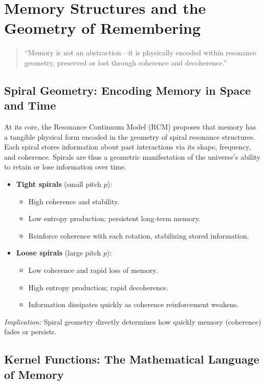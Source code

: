 \section{Memory Structures and the Geometry of Remembering}
\begin{quote}
“Memory is not an abstraction—it is physically encoded within resonance geometry, preserved or lost through coherence and decoherence.”
\end{quote}

\subsection{Spiral Geometry: Encoding Memory in Space and Time}

At its core, the Resonance Continuum Model (RCM) proposes that memory has a tangible physical form encoded in the geometry of spiral resonance structures.  Each spiral stores information about past interactions via its shape, frequency, and coherence.  Spirals are thus a geometric manifestation of the universe’s ability to retain or lose information over time.

\begin{itemize}
  \item \textbf{Tight spirals} (small pitch \(p\)):
    \begin{itemize}
      \item High coherence and stability.
      \item Low entropy production; persistent long‐term memory.
      \item Reinforce coherence with each rotation, stabilizing stored information.
    \end{itemize}
  \item \textbf{Loose spirals} (large pitch \(p\)):
    \begin{itemize}
      \item Low coherence and rapid loss of memory.
      \item High entropy production; rapid decoherence.
      \item Information dissipates quickly as coherence reinforcement weakens.
    \end{itemize}
\end{itemize}

\emph{Implication:} Spiral geometry directly determines how quickly memory (coherence) fades or persists.

\subsection{Kernel Functions: The Mathematical Language of Memory}

